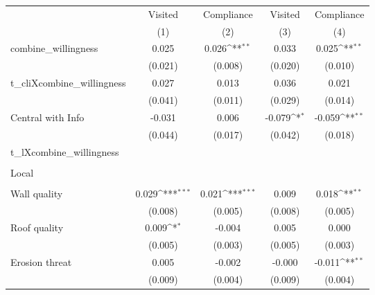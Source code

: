 {
\def\sym#1{\ifmmode^{#1}\else\(^{#1}\)\fi}
\begin{tabular}{l*{4}{c}}
\hline\hline
                &\multicolumn{1}{c}{Visited}&\multicolumn{1}{c}{Compliance}&\multicolumn{1}{c}{Visited}&\multicolumn{1}{c}{Compliance}\\
                &\multicolumn{1}{c}{(1)}         &\multicolumn{1}{c}{(2)}         &\multicolumn{1}{c}{(3)}         &\multicolumn{1}{c}{(4)}         \\
\hline
combine\_willingness&    0.025         &    0.026\sym{**} &    0.033         &    0.025\sym{**} \\
                &  (0.021)         &  (0.008)         &  (0.020)         &  (0.010)         \\
t\_cliXcombine\_willingness&    0.027         &    0.013         &    0.036         &    0.021         \\
                &  (0.041)         &  (0.011)         &  (0.029)         &  (0.014)         \\
Central with Info&   -0.031         &    0.006         &   -0.079\sym{*}  &   -0.059\sym{**} \\
                &  (0.044)         &  (0.017)         &  (0.042)         &  (0.018)         \\
t\_lXcombine\_willingness&                  &                  &                  &                  \\
                &                  &                  &                  &                  \\
Local           &                  &                  &                  &                  \\
                &                  &                  &                  &                  \\
Wall quality    &    0.029\sym{***}&    0.021\sym{***}&    0.009         &    0.018\sym{**} \\
                &  (0.008)         &  (0.005)         &  (0.008)         &  (0.005)         \\
Roof quality    &    0.009\sym{*}  &   -0.004         &    0.005         &    0.000         \\
                &  (0.005)         &  (0.003)         &  (0.005)         &  (0.003)         \\
Erosion threat  &    0.005         &   -0.002         &   -0.000         &   -0.011\sym{**} \\
                &  (0.009)         &  (0.004)         &  (0.009)         &  (0.004)         \\

\end{tabular}}
